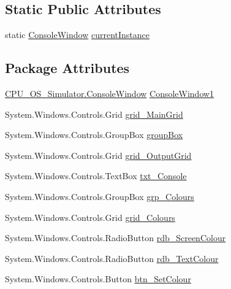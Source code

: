 \subsection*{Static Public Attributes}
\begin{DoxyCompactItemize}
\item 
static \hyperlink{class_c_p_u___o_s___simulator_1_1_console_window}{Console\+Window} \hyperlink{class_c_p_u___o_s___simulator_1_1_console_window_abee2fd1e118dd4f81dc2142bc033da4a}{current\+Instance}
\end{DoxyCompactItemize}
\subsection*{Package Attributes}
\begin{DoxyCompactItemize}
\item 
\hyperlink{class_c_p_u___o_s___simulator_1_1_console_window}{C\+P\+U\+\_\+\+O\+S\+\_\+\+Simulator.\+Console\+Window} \hyperlink{class_c_p_u___o_s___simulator_1_1_console_window_aac987ccfb7f82cf736d42355f96e886b}{Console\+Window1}
\item 
System.\+Windows.\+Controls.\+Grid \hyperlink{class_c_p_u___o_s___simulator_1_1_console_window_a28c9b155f3287ca00079175dc675eee4}{grid\+\_\+\+Main\+Grid}
\item 
System.\+Windows.\+Controls.\+Group\+Box \hyperlink{class_c_p_u___o_s___simulator_1_1_console_window_ad2d026ec9701c1b7c36dc5038927f1ab}{group\+Box}
\item 
System.\+Windows.\+Controls.\+Grid \hyperlink{class_c_p_u___o_s___simulator_1_1_console_window_afef6d481c8b608672b98da16721143b0}{grid\+\_\+\+Output\+Grid}
\item 
System.\+Windows.\+Controls.\+Text\+Box \hyperlink{class_c_p_u___o_s___simulator_1_1_console_window_ad1d4a0c5f573c7e89c8d6ed57d5097e0}{txt\+\_\+\+Console}
\item 
System.\+Windows.\+Controls.\+Group\+Box \hyperlink{class_c_p_u___o_s___simulator_1_1_console_window_aefc749577a14756234b1a73c0a4a6f50}{grp\+\_\+\+Colours}
\item 
System.\+Windows.\+Controls.\+Grid \hyperlink{class_c_p_u___o_s___simulator_1_1_console_window_a0d262972210c72305e20330f5dda9388}{grid\+\_\+\+Colours}
\item 
System.\+Windows.\+Controls.\+Radio\+Button \hyperlink{class_c_p_u___o_s___simulator_1_1_console_window_a1ce1d3ba71dbca9bee53bf6b9c474787}{rdb\+\_\+\+Screen\+Colour}
\item 
System.\+Windows.\+Controls.\+Radio\+Button \hyperlink{class_c_p_u___o_s___simulator_1_1_console_window_a6086d1a5ddaadd584ec129c7372359e2}{rdb\+\_\+\+Text\+Colour}
\item 
System.\+Windows.\+Controls.\+Button \hyperlink{class_c_p_u___o_s___simulator_1_1_console_window_a374a86e391068f8d05edb9649ce3d7f4}{btn\+\_\+\+Set\+Colour}
\end{DoxyCompactItemize}

